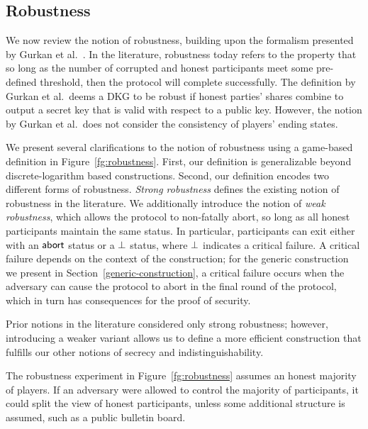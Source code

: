 \subsection{Robustness}

We now review the notion of robustness, building upon the formalism presented by Gurkan et al.~\cite{GurkanJMMST21}.
In the literature, robustness today refers to the property that so long as the number of corrupted and honest participants meet some pre-defined threshold, then the protocol will complete successfully.
The definition by Gurkan et al.\ deems a DKG to be robust if
honest parties' shares combine to output a secret key that is valid with respect to a public key.
However, the notion by Gurkan et al.\ does not consider the consistency of players' ending states.

We present several clarifications to the notion of robustness using a game-based definition in Figure~\ref{fg:robustness}.
First, our definition is generalizable beyond discrete-logarithm based constructions.
Second, our definition encodes two different forms of robustness.
\emph{Strong robustness} defines the existing notion of robustness in the literature.
We additionally introduce the notion of \emph{weak robustness},
which allows the protocol to non-fatally abort,
so long as all honest participants maintain the same status.
In particular, participants can exit either with an $\mathsf{abort}$ status or a $\bot$ status,
where $\bot$ indicates a critical failure.
A critical failure depends on the context of the construction;
for the generic construction we present in Section~\ref{generic-construction},
a critical failure occurs when the adversary can cause the protocol to abort in
the final round of the protocol, which in turn has consequences for the proof
of security.

Prior notions in the literature considered only strong robustness;
however, introducing a weaker variant allows us to define a more efficient construction that fulfills our other notions of secrecy and indistinguishability.

\begin{remark}
  The robustness experiment in Figure~\ref{fg:robustness} assumes an honest majority of players.
  If an adversary were allowed to control the majority of  participants,
  it could split the view of honest participants,
  unless some additional structure is assumed, such as a public bulletin board.
\end{remark}

